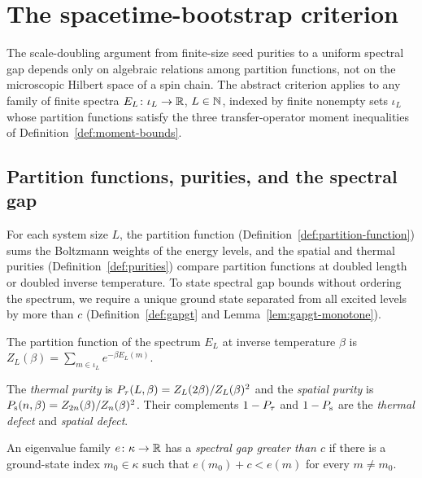 \chapter{The spacetime-bootstrap criterion}
\label{chap:criterion}

The scale-doubling argument from finite-size seed purities to a uniform spectral gap depends only
on algebraic relations among partition functions, not on the microscopic Hilbert space of a spin
chain. The abstract criterion applies to any family of finite spectra
\(E_L \colon \iota_L \to \mathbb{R}\), \(L \in \mathbb{N}\), indexed by finite nonempty sets \(\iota_L\) whose
partition functions satisfy the three transfer-operator moment inequalities of
Definition~\ref{def:moment-bounds}.

\section{Partition functions, purities, and the spectral gap}

For each system size \(L\), the partition function (Definition~\ref{def:partition-function}) sums
the Boltzmann weights of the energy levels, and the spatial and thermal purities
(Definition~\ref{def:purities}) compare partition functions at doubled length or doubled inverse
temperature. To state spectral gap bounds without ordering the spectrum, we require a unique ground
state separated from all excited levels by more than \(c\) (Definition~\ref{def:gapgt} and
Lemma~\ref{lem:gapgt-monotone}).

\begin{definition}
  \label{def:partition-function}
  \leanok
  The partition function of the spectrum \(E_L\) at inverse temperature \(\beta\) is
  \(Z_L(\beta) = \sum_{m \in \iota_L} e^{-\beta E_L(m)}\).
\end{definition}

\begin{definition}
  \label{def:purities}
  \leanok
  The \emph{thermal purity} is \(P_{\tau}(L, \beta) = Z_L(2\beta)/Z_L(\beta)^2\) and the \emph{spatial
  purity} is \(P_{\mathrm{s}}(n, \beta) = Z_{2n}(\beta)/Z_n(\beta)^2\). Their complements \(1 - P_{\tau}\) and
  \(1 - P_{\mathrm{s}}\) are the \emph{thermal defect} and \emph{spatial defect}.
\end{definition}

\begin{definition}
  \label{def:gapgt}
  \leanok
  An eigenvalue family \(e \colon \kappa \to \mathbb{R}\) has a \emph{spectral gap greater than \(c\)} if
  there is a ground-state index \(m_0 \in \kappa\) such that \(e(m_0) + c < e(m)\) for every
  \(m \ne m_0\).
\end{definition}

